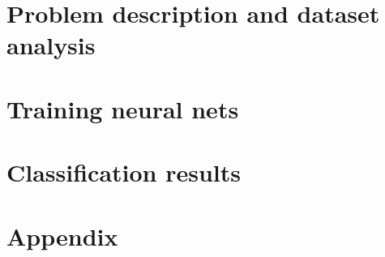 \documentclass[10pt,a4paper]{article}
\begin{document}
\title{\rmfamily\normalfont{}} 
    \author{\\} \date{\today}
    
    \maketitle

    \begin{abstract}
      This article collects the work I did in order to support my
      Quantitative Systems Analysis exam. The goal is to study
      resources usage respect a collection of user profiles, each one
      of them producing different network traffic and CPU/memory
      consumption patterns in different time windows. I performed some
      experiments repeating them over time, analyzing results with a
      piece of Smalltalk software, initially implemented for the
      problem at hand, but it turns out to be far more general.
    \end{abstract}
       
    \tableofcontents
   
 
    \newpage

    \section{Problem description and dataset analysis}
    \lipsum[1]

    \section{Training neural nets}
    \lipsum[1]

    \section{Classification results}
    \lipsum[1]

    \newpage

    \section{Appendix}
    \label{sec:appendix}
\end{document}
